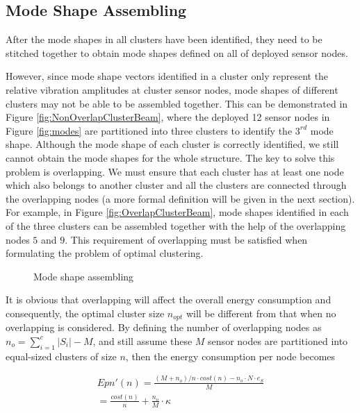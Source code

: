 \subsection{Mode Shape Assembling}
After the mode shapes in all clusters have been identified, they need to be stitched together to obtain mode shapes defined on all of deployed sensor nodes. 

However, since mode shape vectors identified in a cluster only represent the relative vibration amplitudes at cluster sensor nodes, mode shapes of different clusters may not be able to be assembled together. This can be demonstrated in Figure \ref{fig:NonOverlapClusterBeam}, where the deployed 12 sensor nodes in Figure \ref{fig:modes} are partitioned into three clusters to identify the \(3^{rd}\) mode shape.  Although the mode shape of each cluster is correctly identified, we still cannot obtain the mode shapes for the whole structure. The key to solve this problem is overlapping.  We must ensure that each cluster has at least one node which also belongs to another cluster and all the clusters are connected through the overlapping nodes (a more formal definition will be given in the next section).  For example, in Figure \ref{fig:OverlapClusterBeam}, mode shapes identified in each of the three clusters can be assembled together with the help of the overlapping nodes \(5\) and \(9\). This requirement of overlapping must be satisfied when formulating the problem of optimal clustering.

\begin{figure}
\centering
\subfloat[]{\label{fig:NonOverlapClusterBeam}
\figurehalfwidth{NonOverlapClusterBeam}}
\subfloat[]{\label{fig:OverlapClusterBeam}
\figurehalfwidth{OverlapClusterBeam}}
\caption{Mode shape assembling}
\label{fig:TwoTypesClustering}
\end{figure}

It is obvious that overlapping will affect the overall energy consumption and consequently, the optimal cluster size \(n_{opt}\) will be different from that when no overlapping is considered.  By defining the number of overlapping nodes as \(n_o = \sum\limits_{i=1}^c\left|S_i\right| - M\), and still assume these \(M\) sensor nodes are partitioned into equal-sized clusters of size \(n\), then the energy consumption per node becomes

\begin{align}
\label{eq:MagicNumberOverlapping}
Epn'(n) = \frac{(M+n_o)/n \cdot cost(n)- n_o \cdot N \cdot e_S}{M}\\ \nonumber
=\frac{cost(n)}{n}  + \frac{n_o}{M} \cdot \kappa
\end{align}

